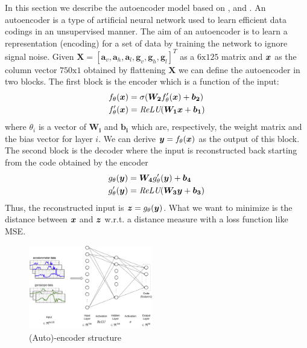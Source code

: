 In this section we describe the autoencoder model based on
\cite{vincent2010stacked}, \cite{gu2018locomotion} and
\cite{gao2019human}. An autoencoder is a type of artificial neural
network used to learn efficient data codings in an unsupervised
manner. The aim of an autoencoder is to learn a representation
(encoding) for a set of data by training the network to ignore signal
noise. Given $\boldsymbol{X} = [ \boldsymbol{a}_v, \boldsymbol{a}_h,
  \boldsymbol{a}_l, \boldsymbol{g}_v, \boldsymbol{g}_h,
  \boldsymbol{g}_l ]^T$ as a $6\text{x}125$ matrix and $\boldsymbol{x}$ as the
column vector $750\text{x}1$ obtained by flattening $\boldsymbol{X}$ we
can define the autoencoder in two blocks. The first block is the
encoder which is a function of the input:
\begin{align}
  f_{\theta}(\boldsymbol{x}) &= \sigma(\boldsymbol{W_{2}} f'_\theta(\boldsymbol{x}) + \boldsymbol{b_{2}}) \\
  f'_{\theta}(\boldsymbol{x}) &= \textit{ReLU}(\boldsymbol{W_{1}}\boldsymbol{x} + \boldsymbol{b_{1}})
\end{align}
where $\theta_{i}$ is a vector of $\boldsymbol{W_{i}}$ and $\boldsymbol{b_{i}}$
which are, respectively, the weight matrix and the bias
vector for layer $i$. We
can derive $\boldsymbol{y} = f_\theta(\boldsymbol{x})$ as the output of this
block. The second block is the decoder where the input is
reconstructed back starting from the code obtained by the encoder
\begin{align}
  g_{\theta}(\boldsymbol{y}) &= \boldsymbol{W_{4}} g'_\theta(\boldsymbol{y}) + \boldsymbol{b_{4}} \\
  g'_{\theta}(\boldsymbol{y}) &= \textit{ReLU}(\boldsymbol{W_{3}}\boldsymbol{y} + \boldsymbol{b_{3}})
\end{align}
Thus, the reconstructed input
is $\boldsymbol{z} = g_{\theta}(\boldsymbol{y})$. What we want to minimize is the distance
between $\boldsymbol{x}$ and $\boldsymbol{z}$ w.r.t. a distance measure with a loss function
like MSE.

\begin{figure}[H]
	\centering
	\includegraphics[width=0.48\textwidth]{images/encoder.png}
	\caption{(Auto)-encoder structure}
	\label{fig:encoder-structure}
\end{figure}

